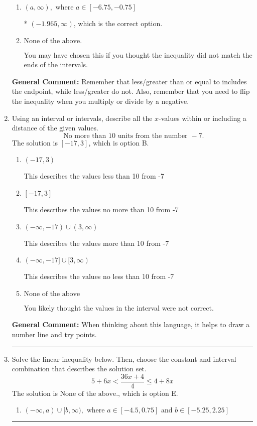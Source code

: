 \documentclass{extbook}[14pt]
\newcommand{\litem}[1]{\item #1

\rule{\textwidth}{0.4pt}}
\begin{document}
\begin{enumerate}
{\begin{enumerate}[label=\Alph*.]
 $(-\infty, -1.965)$, which corresponds to switching the direction of the interval. You likely did this if you did not flip the inequality when dividing by a negative!
\item \( (a, \infty), \text{ where } a \in [-6.75, -0.75] \)

* $(-1.965, \infty)$, which is the correct option.
\item \( \text{None of the above}. \)

You may have chosen this if you thought the inequality did not match the ends of the intervals.
\end{enumerate}

\textbf{General Comment:} Remember that less/greater than or equal to includes the endpoint, while less/greater do not. Also, remember that you need to flip the inequality when you multiply or divide by a negative.
}
\litem{
Using an interval or intervals, describe all the $x$-values within or including a distance of the given values.
\[ \text{ No more than } 10 \text{ units from the number } -7. \]The solution is \( [-17, 3] \), which is option B.\begin{enumerate}[label=\Alph*.]
\item \( (-17, 3) \)

This describes the values less than 10 from -7
\item \( [-17, 3] \)

This describes the values no more than 10 from -7
\item \( (-\infty, -17) \cup (3, \infty) \)

This describes the values more than 10 from -7
\item \( (-\infty, -17] \cup [3, \infty) \)

This describes the values no less than 10 from -7
\item \( \text{None of the above} \)

You likely thought the values in the interval were not correct.
\end{enumerate}

\textbf{General Comment:} When thinking about this language, it helps to draw a number line and try points.
}
\litem{
Solve the linear inequality below. Then, choose the constant and interval combination that describes the solution set.
\[ 5 + 6 x < \frac{36 x + 4}{4} \leq 4 + 8 x \]The solution is \( \text{None of the above.} \), which is option E.\begin{enumerate}[label=\Alph*.]
\item \( (-\infty, a) \cup [b, \infty), \text{ where } a \in [-4.5, 0.75] \text{ and } b \in [-5.25, 2.25] \)


\end{enumerate}}
\end{enumerate}
\end{document}
